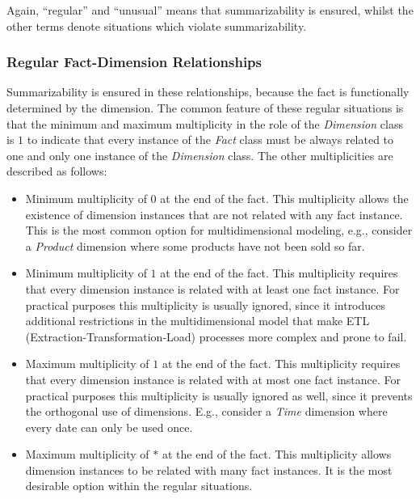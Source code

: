 Again, ``regular'' and ``unusual'' means that summarizability is
ensured, whilst the other terms denote situations which violate
summarizability.

\subsubsection{Regular Fact-Dimension Relationships} Summarizability is ensured in these relationships, because the fact
is functionally determined by the dimension. The common feature of
these regular situations is that the minimum and maximum
multiplicity in the role of the \emph{Dimension} class is $1$ to
indicate that every instance of the \emph{Fact} class must be always
related to one and only one instance of the \emph{Dimension} class.
The other multiplicities are described as follows:

\begin{itemize}

\item Minimum multiplicity of $0$ at the end of the fact. This
multiplicity allows the existence of dimension instances that are
not related with any fact instance. This is the most common option
for multidimensional modeling, e.g., consider a \emph{Product}
dimension where some products have not been sold so far.

\item Minimum multiplicity of $1$ at the end of the fact. This
multiplicity requires that every dimension instance is related with
at least one fact instance. For practical purposes this multiplicity
is usually ignored, since it introduces additional restrictions in
the multidimensional model that make ETL
(Extrac\-tion-Transformation-Load) processes more complex and prone
to fail.

\item Maximum multiplicity of $1$ at the end of the fact. This
multiplicity requires that every dimension instance is related with
at most one fact instance. For practical purposes this multiplicity
is usually ignored as well, since it prevents the orthogonal use of
dimensions. E.g., consider a \emph{Time} dimension where every date
can only be used once.

\item Maximum multiplicity of $*$ at the end of the fact. This
multiplicity allows dimension instances to be related with many fact
instances. It is the most desirable option within the regular
situations.
\end{itemize}


